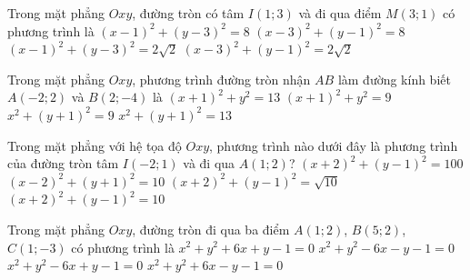 \begin{ex}%
	Trong mặt phẳng $Oxy$, đường tròn có tâm $I(1;3)$  và đi qua điểm $M(3;1)$ có phương trình là
	\choice 
		{\True  $(x-1)^2+(y-3)^2=8$}
		 {$(x-3)^2+(y-1)^2=8$}
		 {$(x-1)^2+(y-3)^2=2\sqrt{2}$}
		 {$(x-3)^2+(y-1)^2=2\sqrt{2}$}
\end{ex}

\begin{ex}%
	Trong mặt phẳng $Oxy$, phương trình đường tròn nhận $AB$  làm đường kính biết $A(-2; 2)$ và $B(2;-4)$ là
	\choice 
		 {$(x+1)^{2}+y^{2}=13$}
		{$(x+1)^{2}+y^{2}=9$} 
		{$x^{2}+(y+1)^{2}=9$} 
		{\True $x^{2}+(y+1)^{2}=13$} 
\end{ex}

\begin{ex}%
	 Trong mặt phẳng với hệ tọa độ $Oxy$, phương trình nào dưới đây là phương trình của đường tròn tâm $I(-2;1)$ và đi qua $A(1;2)$?
	 \choice
		{$(x+2)^2+(y-1)^2=100$} 
		 {$(x-2)^2+(y+1)^2=10$}
		{$(x+2)^2+(y-1)^2=\sqrt{10}$} 
		{\True  $(x+2)^2+(y-1)^2=10$}
\end{ex}

\begin{ex}%
	Trong mặt phẳng $Oxy$, đường tròn đi  qua ba điểm $A(1;2)$, $B(5;2)$, $C(1;-3)$ có phương trình là
	\choice 
		{$x^2+y^2+6x+y-1=0$} 
		{$x^2+y^2-6x-y-1=0$} 
		{\True $x^2+y^2-6x+y-1=0$} 
		{$x^2+y^2+6x-y-1=0$} 
\end{ex}


